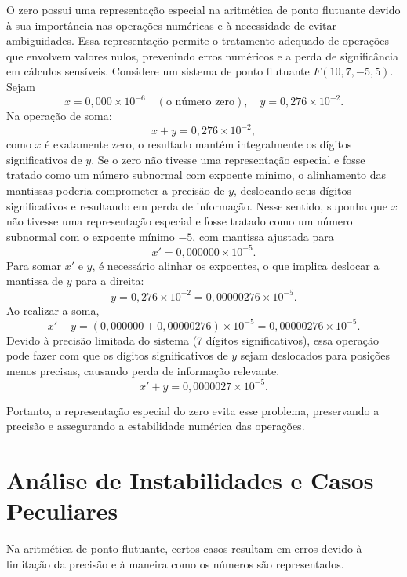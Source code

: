 O zero possui uma representação especial na aritmética de ponto flutuante
devido à sua importância nas operações numéricas e à necessidade de evitar
ambiguidades. Essa representação permite o tratamento adequado de operações que
envolvem valores nulos, prevenindo erros numéricos e a perda de significância
em cálculos sensíveis. Considere um sistema de ponto flutuante \( F(10, 7, -5,
5) \). Sejam
\[
  x = 0{,}000 \times 10^{-6} \quad (\text{o número zero}), \quad y = 0{,}276 \times 10^{-2}.
\]
Na operação de soma:
\[
  x + y = 0{,}276 \times 10^{-2},
\]
como \( x \) é exatamente zero, o resultado mantém integralmente os dígitos
significativos de \( y \).  Se o zero não tivesse uma representação especial e fosse tratado
como um número subnormal com expoente mínimo, o alinhamento das mantissas
poderia comprometer a precisão de \( y \), deslocando seus dígitos
significativos e resultando em perda de informação. Nesse sentido, suponha que
\( x \) não tivesse uma representação especial e fosse tratado como um número
subnormal com o expoente mínimo \( -5 \), com mantissa ajustada para
\[
  x' = 0{,}000000 \times 10^{-5}.
\]
Para somar \( x' \) e \( y \), é necessário alinhar os expoentes, o que implica
deslocar a mantissa de \( y \) para a direita:
\[
  y = 0{,}276 \times 10^{-2} = 0{,}00000276 \times 10^{-5}.
\]
Ao realizar a soma,
\[
  x' + y = (0{,}000000 + 0{,}00000276) \times 10^{-5} = 0{,}00000276 \times 10^{-5}.
\]
Devido à precisão limitada do sistema (7 dígitos significativos), essa operação
pode fazer com que os dígitos significativos de \( y \) sejam deslocados para
posições menos precisas, causando perda de informação relevante.
\[
  x' + y = 0{,}0000027 \times 10^{-5}.
\]

Portanto, a representação especial do zero evita esse problema, preservando a
precisão e assegurando a estabilidade numérica das operações.

\section{Análise de Instabilidades e Casos Peculiares}

Na aritmética de ponto flutuante, certos casos resultam em erros devido à
limitação da precisão e à maneira como os números são representados.

